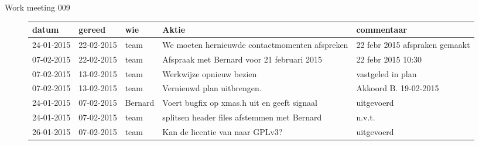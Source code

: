 \documentclass[a4paper,final]{article}
\begin{document}
\begin{Minutes}{Work meeting 009}
\begin{figure}[p]
\begin{tabular}{|l|l|l|p{10em}|p{10em}|}
\hline
{\bf datum} & {\bf gereed} & {\bf wie} & {\bf Aktie}                                      & commentaar      \\\hline
24-01-2015  & 22-02-2015   & team      & We moeten hernieuwde contactmomenten afspreken   & 22 febr 2015 afspraken gemaakt\\\hline
07-02-2015  & 22-02-2015   & team      & Afspraak met Bernard voor 21 februari 2015       & 22 febr 2015 10:30\\\hline
07-02-2015  & 13-02-2015   & team      & Werkwijze opnieuw bezien                         & vastgeled in plan\\\hline
07-02-2015  & 13-02-2015   & team      & Vernieuwd plan uitbrengen.                       & Akkoord B. 19-02-2015\\\hline
24-01-2015  & 07-02-2015   & Bernard   & Voert bugfix op xmas.h uit en geeft signaal      & uitgevoerd\\\hline
24-01-2015  & 07-02-2015   & team      & splitsen header files afstemmen met Bernard      & n.v.t.\\\hline
26-01-2015  & 07-02-2015   & team      & Kan de licentie van \w{bitpower lib} naar GPLv3? & uitgevoerd\\\hline
\end{tabular}
\end{figure}

\end{Minutes}
\end{document}
